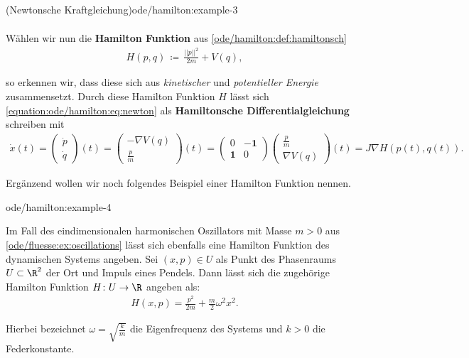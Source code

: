 \documentclass[letterpaper,10pt,english]{jupyterBook}
\begin{document}
\begin{example}{(Newtonsche Kraftgleichung)}{ode/hamilton:example-3}
\begin{align}
\end{align}
\par
Wählen wir nun die \textbf{Hamilton Funktion} aus \cref{ode/hamilton:def:hamiltonsch} \begin{align*}
H(p,q) \, \coloneqq \, \frac{||p||^2}{2m} + V(q),
\end{align*}
\par
so erkennen wir, dass diese sich aus \emph{kinetischer} und \emph{potentieller Energie} zusammensetzt.
Durch diese Hamilton Funktion \(H\) lässt sich \eqref{equation:ode/hamilton:eq:newton} als \textbf{Hamiltonsche Differentialgleichung} schreiben mit
\begin{align*}
\dot{x}(t) = \begin{pmatrix}\dot{p} \\ \dot{q} \end{pmatrix}(t) = \begin{pmatrix} -\nabla V(q) \\ \frac{p}{m} \end{pmatrix}(t) = \begin{pmatrix}0 & -\mathbf{1}\\ \mathbf{1} & 0 \end{pmatrix} \begin{pmatrix} \frac{p}{m} \\ \nabla V(q) \end{pmatrix}(t) = J \nabla H(p(t),q(t)).
\end{align*}\end{example}

\par
Ergänzend wollen wir noch folgendes Beispiel einer Hamilton Funktion nennen.
\begin{example}{}{ode/hamilton:example-4}



\par
Im Fall des eindimensionalen harmonischen Oszillators mit Masse \(m > 0\) aus \cref{ode/fluesse:ex:oscillations} lässt sich ebenfalls eine Hamilton Funktion des dynamischen Systems angeben.
Sei \((x,p) \in U\) als Punkt des Phasenraums \(U \subset \R^2\) der Ort und Impuls eines Pendels.
Dann lässt sich die zugehörige Hamilton Funktion \(H \colon U \rightarrow \R\) angeben als:
\begin{align*}
H(x,p) = \frac{p^2}{2m} + \frac{m}{2} \omega^2 x^2.
\end{align*}
\par
Hierbei bezeichnet \(\omega = \sqrt{\frac{k}{m}}\) die Eigenfrequenz des Systems und \(k > 0\) die Federkonstante.
\end{example}
\end{document}
